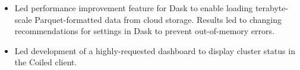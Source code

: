 \begin{itemize}
\item Led performance improvement feature for Dask to enable loading terabyte-scale Parquet-formatted data from cloud storage. Results led to changing recommendations for settings in Dask to prevent out-of-memory errors.
\item Led development of a highly-requested dashboard to display cluster status in the Coiled client.
\end{itemize}
\sectionsep

\\
\\


